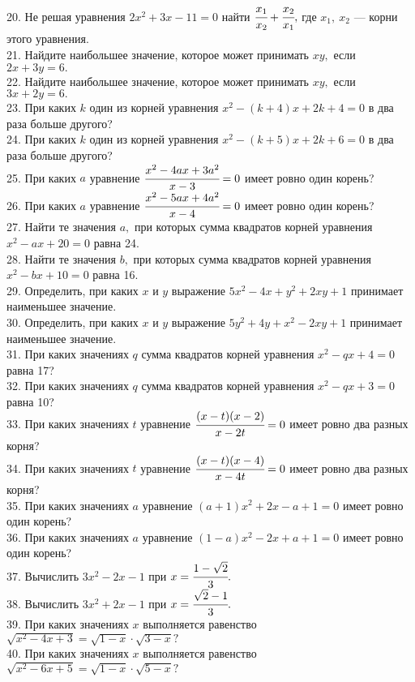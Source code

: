 20. Не решая уравнения $2x^2+3x-11=0$ найти $\cfrac{x_1}{x_2}+\cfrac{x_2}{x_1},$ где $x_1,\ x_2$ --- корни этого уравнения.\\
21. Найдите наибольшее значение, которое может принимать $xy,$ если $2x+3y=6.$\\
22. Найдите наибольшее значение, которое может принимать $xy,$ если $3x+2y=6.$\\
23. При каких $k$ один из корней уравнения $x^2-(k+4)x+2k+4=0$ в два раза больше другого?\\
24. При каких $k$ один из корней уравнения $x^2-(k+5)x+2k+6=0$ в два раза больше другого?\\
25. При каких $a$ уравнение $\cfrac{x^2-4ax+3a^2}{x-3}=0$ имеет ровно один корень?\\
26. При каких $a$ уравнение $\cfrac{x^2-5ax+4a^2}{x-4}=0$ имеет ровно один корень?\\
27. Найти те значения $a,$ при которых сумма квадратов корней уравнения $x^2-ax+20=0$ равна 24.\\
28. Найти те значения $b,$ при которых сумма квадратов корней уравнения $x^2-bx+10=0$ равна 16.\\
29. Определить, при каких $x$ и $y$ выражение $5x^2-4x+y^2+2xy+1$ принимает наименьшее значение.\\
30. Определить, при каких $x$ и $y$ выражение $5y^2+4y+x^2-2xy+1$ принимает наименьшее значение.\\
31. При каких значениях $q$ сумма квадратов корней уравнения $x^2-qx+4=0$ равна 17?\\
32. При каких значениях $q$ сумма квадратов корней уравнения $x^2-qx+3=0$ равна 10?\\
33. При каких значениях $t$ уравнение $\cfrac{(x-t)(x-2)}{x-2t}=0$ имеет ровно два разных корня?\\
34. При каких значениях $t$ уравнение $\cfrac{(x-t)(x-4)}{x-4t}=0$ имеет ровно два разных корня?\\
35. При каких значениях $a$ уравнение $(a+1)x^2+2x-a+1=0$ имеет ровно один корень?\\
36. При каких значениях $a$ уравнение $(1-a)x^2-2x+a+1=0$ имеет ровно один корень?\\
37. Вычислить $3x^2-2x-1$ при $x=\cfrac{1-\sqrt{2}}{3}.$\\
38. Вычислить $3x^2+2x-1$ при $x=\cfrac{\sqrt{2}-1}{3}.$\\
39. При каких значениях $x$ выполняется равенство $\sqrt{x^2-4x+3}=\sqrt{1-x}\cdot\sqrt{3-x}?$\\
40. При каких значениях $x$ выполняется равенство $\sqrt{x^2-6x+5}=\sqrt{1-x}\cdot\sqrt{5-x}?$\\
